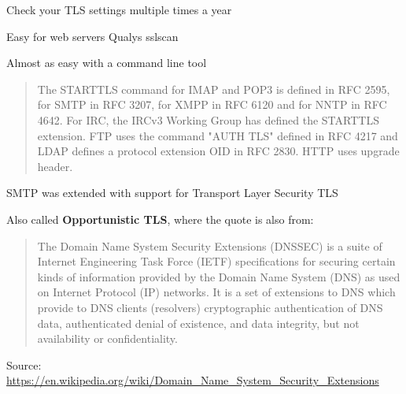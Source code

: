\documentclass[Screen16to9,17pt]{foils}
\begin{document}


\begin{list2}
\item Check your TLS settings multiple times a year
\item Easy for web servers Qualys sslscan
\item Almost as easy with a command line tool
\end{list2}




\begin{quote}
The STARTTLS command for IMAP and POP3 is defined in RFC 2595, for SMTP in RFC 3207, for XMPP in RFC 6120 and for NNTP in RFC 4642. For IRC, the IRCv3 Working Group has defined the STARTTLS extension. FTP uses the command "AUTH TLS" defined in RFC 4217 and LDAP defines a protocol extension OID in RFC 2830. HTTP uses upgrade header.
\end{quote}

\begin{list1}
\item SMTP was extended with support for Transport Layer Security TLS
\item Also called {\bf Opportunistic TLS}, where the quote is also from:\\ 
\end{list1}





\begin{quote}
The Domain Name System Security Extensions (DNSSEC) is a suite of Internet Engineering Task Force (IETF) specifications for securing certain kinds of information provided by the Domain Name System (DNS) as used on Internet Protocol (IP) networks. It is a set of extensions to DNS which provide to DNS clients (resolvers) cryptographic authentication of DNS data, authenticated denial of existence, and data integrity, but not availability or confidentiality.
\end{quote}
Source:\\{\footnotesize
\url{https://en.wikipedia.org/wiki/Domain_Name_System_Security_Extensions}}


\end{document}
